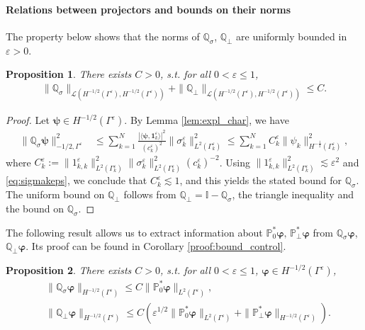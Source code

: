 \documentclass[]{article}
\newtheorem{proposition}{Proposition}
\numberwithin{equation}{section}
\numberwithin{theorem}{section}
\numberwithin{lemma}{section}
\numberwithin{corollary}{section}
\numberwithin{proposition}{section}
\numberwithin{definition}{section}
\newcommand{\re}{\varepsilon}
\renewcommand{\vec}{\boldsymbol}
\begin{document}
	\paragraph{Relations between projectors and bounds on their norms}
	The property below shows that the norms of $\mathbb{Q}_{\sigma}$, $\mathbb{Q}_{\perp}$ are uniformly bounded in $\re>0$. 
	\begin{proposition}
		\label{prop:norm_projectors_Q}
		There exists $C>0$, s.t. for all $0<\re\leq 1$, 
		\begin{align*}%
			\|\mathbb{Q}_{\sigma}\|_{\mathcal{L}(H^{-1/2}(\Gamma^{\re}),H^{-1/2}(\Gamma^{\re}))}+	\|\mathbb{Q}_{\perp}\|_{\mathcal{L}(H^{-1/2}(\Gamma^{\re}),H^{-1/2}(\Gamma^{\re}))}\leq C.
		\end{align*}
	\end{proposition}
	\begin{proof}
		Let $\boldsymbol{\psi} \in H^{-1/2}(\Gamma^{\re})$. By Lemma \ref{lem:expl_char}, we have
		\begin{align*}%
			\| \mathbb{Q}_{\sigma} \boldsymbol{\psi} \|^2_{-1/2,\Gamma^{\re}} &\leq \sum_{k=1}^N \frac{|\langle \boldsymbol{\psi}, \boldsymbol{1}^{\re}_k \rangle|^2}{(c_k^{\re})^2}  \| {\sigma}^{\re}_k \|^2_{L^2(\Gamma^{\re}_k)} \leq \sum_{k=1}^N C_k^{\re}\| {\psi}_k \|^2_{H^{-\frac{1}{2}}(\Gamma^{\re}_k)},
		\end{align*}
		where $C_k^{\re}:=\| {1}^{\re}_{k,k}\|^2_{L^2(\Gamma^{\re}_k)}\| {\sigma}^{\re}_k \|^2_{L^2(\Gamma^{\re}_k)}(c_k^{\re})^{-2}$. 
		Using $\| {1}^{\re}_{k,k}\|^2_{L^2(\Gamma^{\re}_k)}\lesssim \re^2$ and \eqref{eq:sigmakeps},  we conclude that $C_k^{\re}\lesssim 1$, and this yields the stated bound for $\mathbb{Q}_{\sigma}$. The uniform bound on $\mathbb{Q}_{\perp}$ follows from  $\mathbb{Q}_{\perp}=\mathbb{I}-\mathbb{Q}_{\sigma}$, the triangle inequality and the bound on $\mathbb{Q}_{\sigma}$. 
	\end{proof}
	The following result allows us to extract information about $\mathbb{P}_0^*\vec{\varphi}, \, \mathbb{P}_{\perp}^*\vec{\varphi}$ from $\mathbb{Q}_{\sigma}\vec{\varphi}$, $\mathbb{Q}_{\perp}\vec{\varphi}$. Its proof can be found in Corollary \ref{proof:bound_control}. 
	\begin{proposition}
		\label{prop:bound_control}
		There exists $C>0$, s.t. for all $0<\re\leq 1$, $\vec{\varphi}\in H^{-1/2}(\Gamma^{\re})$, 
		\begin{align*}%
			&\|\mathbb{Q}_{\sigma}\boldsymbol{\varphi}\|_{H^{-1/2}(\Gamma^{\re})} \leq C \|\mathbb{P}_0^*\boldsymbol{\varphi}\|_{L^2(\Gamma^{\re})} , \\
			&\|\mathbb{Q}_{\perp}\boldsymbol{\varphi}\|_{H^{-1/2}(\Gamma^{\re})} \leq C(\re^{1/2}\|\mathbb{P}_0^*\boldsymbol{\varphi}\|_{L^2(\Gamma^{\re})}+
			\|\mathbb{P}_{\perp}^*\boldsymbol{\varphi}\|_{H^{-1/2}(\Gamma^{\re})}).
		\end{align*}
	\end{proposition}
\end{document}
